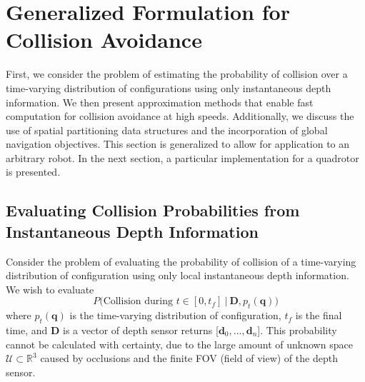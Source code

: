 \documentclass{llncs}
\begin{document}
\section{Generalized Formulation for Collision Avoidance}

First, we consider the problem of estimating the probability of collision over a time-varying distribution of configurations using only instantaneous depth information.  We then present approximation methods that enable fast computation for collision avoidance at high speeds.  Additionally, we discuss the use of spatial partitioning data structures and the incorporation of global navigation objectives.  This section is generalized to allow for application to an arbitrary robot.  In the next section, a particular implementation for a quadrotor is presented.

\subsection{Evaluating Collision Probabilities from Instantaneous Depth Information}

Consider the problem of evaluating the probability of collision of a time-varying distribution of configuration using only local instantaneous depth information.  We wish to evaluate
%
\begin{equation} 
P\big(\text{Collision during } t \in [0, t_f] \ | \ \mathbf{D}, p_t(\mathbf{q}) \big)
\end{equation}
%
where $p_t(\mathbf{q})$ is the time-varying distribution of configuration, $t_f$ is the final time, and $\mathbf{D}$ is a vector of depth sensor returns [$\mathbf{d}_0, ..., \mathbf{d}_n$].  This probability cannot be calculated with certainty, due to the large amount of unknown space $\mathcal{U} \subset \mathbb{R}^{3}$ caused by occlusions and the finite FOV (field of view) of the depth sensor.  

\end{document}
